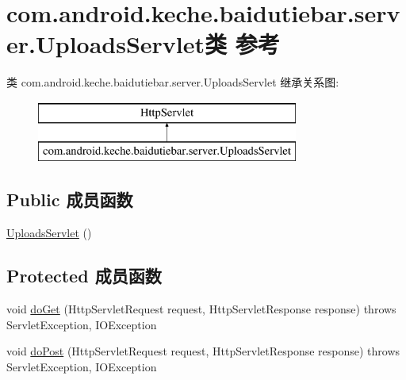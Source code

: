 \hypertarget{classcom_1_1android_1_1keche_1_1baidutiebar_1_1server_1_1_uploads_servlet}{}\section{com.\+android.\+keche.\+baidutiebar.\+server.\+Uploads\+Servlet类 参考}
\label{classcom_1_1android_1_1keche_1_1baidutiebar_1_1server_1_1_uploads_servlet}
类 com.\+android.\+keche.\+baidutiebar.\+server.\+Uploads\+Servlet 继承关系图\+:\begin{figure}[H]
\begin{center}
\leavevmode
\includegraphics[height=2.000000cm]{classcom_1_1android_1_1keche_1_1baidutiebar_1_1server_1_1_uploads_servlet}
\end{center}
\end{figure}
\subsection*{Public 成员函数}
\begin{DoxyCompactItemize}
\item 
\mbox{\hyperlink{classcom_1_1android_1_1keche_1_1baidutiebar_1_1server_1_1_uploads_servlet_ab904445e2e96bb2024fe3a4acc484eb2}{Uploads\+Servlet}} ()
\end{DoxyCompactItemize}
\subsection*{Protected 成员函数}
\begin{DoxyCompactItemize}
\item 
void \mbox{\hyperlink{classcom_1_1android_1_1keche_1_1baidutiebar_1_1server_1_1_uploads_servlet_a922ca58226c6ac3ed8e3292814cb33e1}{do\+Get}} (Http\+Servlet\+Request request, Http\+Servlet\+Response response)  throws Servlet\+Exception, I\+O\+Exception 
\item 
void \mbox{\hyperlink{classcom_1_1android_1_1keche_1_1baidutiebar_1_1server_1_1_uploads_servlet_a8932c35f6e491f9b8a36f07bf494639d}{do\+Post}} (Http\+Servlet\+Request request, Http\+Servlet\+Response response)  throws Servlet\+Exception, I\+O\+Exception 
\end{DoxyCompactItemize}


